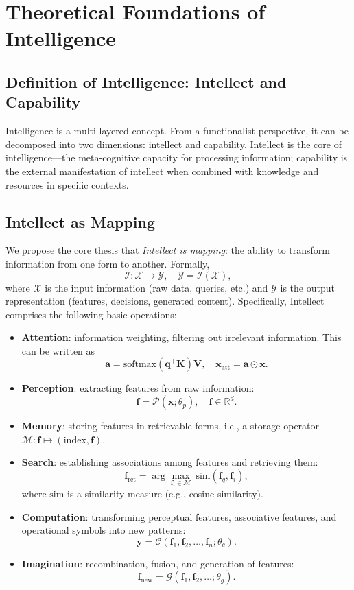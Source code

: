 \documentclass[12pt,a4paper]{article}
\begin{document}
\section{Theoretical Foundations of Intelligence}
\subsection{Definition of Intelligence: Intellect and Capability}
Intelligence is a multi-layered concept. From a functionalist perspective, it can be decomposed into two dimensions: intellect and capability. Intellect is the core of intelligence—the meta-cognitive capacity for processing information; capability is the external manifestation of intellect when combined with knowledge and resources in specific contexts.

\subsection{Intellect as Mapping}
We propose the core thesis that \emph{Intellect is mapping}: the ability to transform information from one form to another. Formally, 
\[
\mathcal{I}: \mathcal{X} \to \mathcal{Y}, \quad \mathcal{Y} = \mathcal{I}(\mathcal{X}),
\]
where $\mathcal{X}$ is the input information (raw data, queries, etc.) and $\mathcal{Y}$ is the output representation (features, decisions, generated content). Specifically, Intellect comprises the following basic operations:
\begin{itemize}
\item \textbf{Attention}: information weighting, filtering out irrelevant information. This can be written as 
\[
\mathbf{a} = \text{softmax}(\mathbf{q}^\top \mathbf{K}) \mathbf{V}, \quad \mathbf{x}_{\text{att}} = \mathbf{a} \odot \mathbf{x}.
\]
\item \textbf{Perception}: extracting features from raw information: 
\[
\mathbf{f} = \mathcal{P}(\mathbf{x}; \theta_p), \quad \mathbf{f} \in \mathbb{R}^d.
\]
\item \textbf{Memory}: storing features in retrievable forms, i.e., a storage operator $\mathcal{M}: \mathbf{f} \mapsto (\text{index}, \mathbf{f})$.
\item \textbf{Search}: establishing associations among features and retrieving them:
\[
\mathbf{f}_{\text{ret}} = \arg\max_{\mathbf{f}_i \in \mathcal{M}} \ \text{sim}(\mathbf{f}_q, \mathbf{f}_i),
\]
where $\text{sim}$ is a similarity measure (e.g., cosine similarity).
\item \textbf{Computation}: transforming perceptual features, associative features, and operational symbols into new patterns:
\[
\mathbf{y} = \mathcal{C}(\mathbf{f}_1, \mathbf{f}_2, \dots, \mathbf{f}_n; \theta_c).
\]
\item \textbf{Imagination}: recombination, fusion, and generation of features:
\[
\mathbf{f}_{\text{new}} = \mathcal{G}(\mathbf{f}_1, \mathbf{f}_2, \dots; \theta_g).
\]
\end{itemize}
\end{document}
